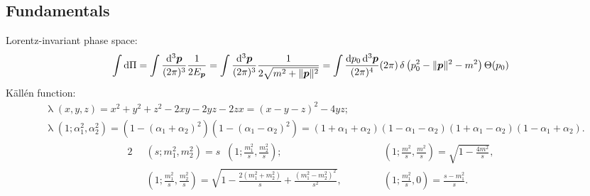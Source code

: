 \documentclass[CheatSheet]{subfiles}
\begin{document}
\subsection{Fundamentals}
Lorentz-invariant phase space:
\begin{equation*}
\int\dd\Pi
= \int\ddP{p}\frac{1}{2E_{\vc p}}
= \int\ddP{p}\frac{1}{2\sqrt{m^2+\|\vc p\|^2}}
= \int\frac{\dd p_0\dd^3\vc p}{(2\pi)^4}(2\pi)\diracdelta\left(p_0^2-\|\vc p\|^2-m^2\right)\Theta(p_0)
\end{equation*}
K\"all\'en function:
\begin{align*}
&\mathop{\lambda}(x,y,z)
= x^2+y^2+z^2-2xy-2yz-2zx
= (x-y-z)^2-4yz;
\\
&
\mathop{\lambda}(1;\alpha_1^2,\alpha_2^2)
= (1-(\alpha_1+\alpha_2)^2)(1-(\alpha_1-\alpha_2)^2)
= (1+\alpha_1+\alpha_2)(1-\alpha_1-\alpha_2)(1+\alpha_1-\alpha_2)(1-\alpha_1+\alpha_2).
\end{align*}
\begin{alignat*}{2}
&\mathop{\lambda^{1/2}}\left(s;m_1^2, m_2^2\right) = s\mathop{\lambda^{1/2}}\left(1;\frac{m_1^2}{s}, \frac{m_2^2}{s}\right);&
\qquad
&\mathop{\lambda^{1/2}}\left(1;\frac{m^2}{s},\frac{m^2}{s}\right)
= \sqrt{1-\frac{4 m^2}{s}},\\
&\mathop{\lambda^{1/2}}\left(1;\frac{m_1^2}{s},\frac{m_2^2}{s}\right)
= \sqrt{1-\frac{2 (m_1^2+m_2^2)}{s}+\frac{(m_1^2-m_2^2)^2}{s^2}},&
&\mathop{\lambda^{1/2}}\left(1;\frac{m_1^2}{s},0\right)
= \frac{s-m_1^2}{s}.
\end{alignat*}
\end{document}
